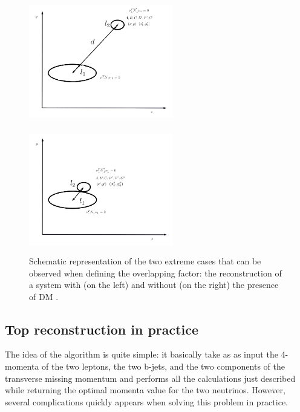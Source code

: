 \documentclass[a4paper, 10pt, openright]{report}
\begin{document}
\begin{itemize}
\begin{figure}[htbp]
\centering
\begin{minipage}[b]{.48\textwidth}
\includegraphics[width=6.3cm, height=5.5cm]{figs/ElipseDM3.png}
\end{minipage}\hfill
\begin{minipage}[b]{.48\textwidth}
\includegraphics[width=6.3cm, height=5.5cm]{figs/Elipsettnormal.png}
\end{minipage} \hfill
\caption{ Schematic representation of the two extreme cases that can be observed when defining the overlapping factor: the reconstruction of a system with (on the left) and without (on the right) the presence of \ac{DM} \cite{Agustin}.}
\label{fig:ellipsesDM}
\end{figure}

\end{itemize}

\subsection{Top reconstruction in practice}

The idea of the algorithm is quite simple: it basically take as as input the 4-momenta of the two leptons, the two b-jets, and the two components of the transverse missing momentum and performs all the calculations just described while returning the optimal momenta value for the two neutrinos. However, several complications quickly appears when solving this problem in practice.
\end{document}
